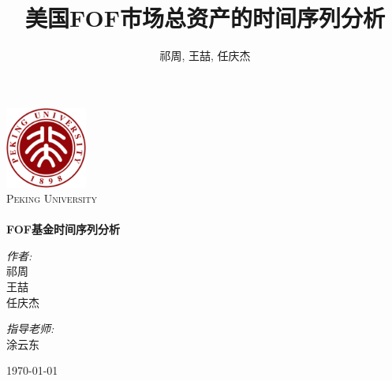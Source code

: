 \documentclass[10.5pt,onecolumn,a4paper]{article}%
\title{美国FOF市场总资产的时间序列分析}
\author{祁周, 王喆, 任庆杰}
\begin{document}
\begin{titlepage}	
	\begin{center}	
		\includegraphics[width=0.2\textwidth]{./pkulogo}\\[1cm]    
		
		\textsc{\LARGE Peking University}\\[1.5cm]
		
		\textsc{\Large }\\[2cm]
		
		

		{ \huge \bfseries FOF基金时间序列分析}\\[3cm]

		
		\begin{minipage}{0.4\textwidth}
			\begin{flushleft} \large
				\emph{\Large 作者:}\\
				\Large 祁周\\
				\Large 王喆\\
				\Large 任庆杰
			\end{flushleft}
		\end{minipage}
		\begin{minipage}{0.4\textwidth}
			\begin{flushright} \large
				\emph{\Large 指导老师:} \\
		\Large 涂云东
			\end{flushright}
		\end{minipage}
		
		\vfill
		
		{\large \today}
		
	\end{center}
	
\end{titlepage}







\clearpage











\clearpage



\appendix


\end{document}

